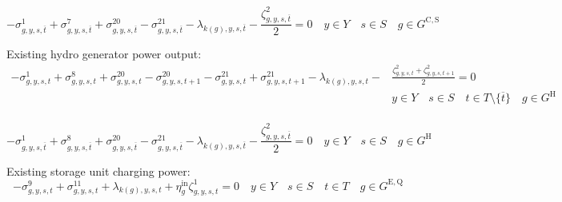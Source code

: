 \documentclass{article}
\newcommand{\sGeneratorsCandidateSolar}{G^{\mathrm{C,S}}}
\newcommand{\sGeneratorsHydro}{G^{\mathrm{H}}}
\newcommand{\sStorageExisting}{G^{\mathrm{E,Q}}}
\newcommand{\sYears}{Y}
\newcommand{\sScenarios}{S}
\newcommand{\sIntervals}{T}
\newcommand{\iGenerator}{g}
\newcommand{\iYear}{y}
\newcommand{\iScenario}{s}
\newcommand{\iInterval}{t}
\newcommand{\iIntervalTerminal}{\overline{\iInterval}}
\newcommand{\iZone}{z}
\newcommand{\cStorageUnitEfficiencyCharging}{\eta_{\iGenerator}^{\mathrm{in}}}
\newcommand{\dMinPowerOutput}[1][\iGenerator,\iYear,\iScenario,\iInterval]{\sigma_{#1}^{1}}
\newcommand{\dMaxPowerOutputSolarCandidate}[1][\iGenerator,\iYear,\iScenario,\iInterval]{\sigma_{#1}^{7}}
\newcommand{\dMaxPowerOutputHydro}[1][\iGenerator,\iYear,\iScenario,\iInterval]{\sigma_{#1}^{8}}
\newcommand{\dNonNegativeCharging}[1][\iGenerator,\iYear,\iScenario,\iInterval]{\sigma_{#1}^{9}}
\newcommand{\dMaxChargingRateExisting}[1][\iGenerator,\iYear,\iScenario,\iInterval]{\sigma_{#1}^{11}}
\newcommand{\dRampRateUp}[1][\iGenerator,\iYear,\iScenario,\iInterval]{\sigma_{#1}^{20}}
\newcommand{\dRampRateDown}[1][\iGenerator,\iYear,\iScenario,\iInterval]{\sigma_{#1}^{21}}
\newcommand{\dPowerBalance}[1][\iZone,\iYear,\iScenario,\iInterval]{\lambda_{#1}}
\newcommand{\dStorageEnergyTransition}[1][\iGenerator,\iYear,\iScenario,\iInterval]{\zeta_{#1}^{1}}
\newcommand{\dGeneratorEnergyOutput}[1][\iGenerator,\iYear,\iScenario,\iInterval]{\zeta_{#1}^{2}}
\begin{document}
\begin{equation}
-\dMinPowerOutput[\iGenerator,\iYear,\iScenario,\iIntervalTerminal] + \dMaxPowerOutputSolarCandidate[\iGenerator,\iYear,\iScenario,\iIntervalTerminal] + \dRampRateUp[\iGenerator,\iYear,\iScenario,\iIntervalTerminal] - \dRampRateDown[\iGenerator,\iYear,\iScenario,\iIntervalTerminal] - \dPowerBalance[k(\iGenerator),\iYear,\iScenario,\iIntervalTerminal] - \frac{\dGeneratorEnergyOutput[\iGenerator,\iYear,\iScenario,\iIntervalTerminal]}{2} = 0 \quad \iYear \in \sYears \quad \iScenario \in \sScenarios \quad \iGenerator \in \sGeneratorsCandidateSolar
\end{equation}

Existing hydro generator power output:
\begin{align}
-\dMinPowerOutput + \dMaxPowerOutputHydro + \dRampRateUp - \dRampRateUp[\iGenerator,\iYear,\iScenario,\iInterval+1] - \dRampRateDown + \dRampRateDown[\iGenerator,\iYear,\iScenario,\iInterval+1] - \dPowerBalance[k(\iGenerator),\iYear,\iScenario,\iInterval] - & \frac{\dGeneratorEnergyOutput + \dGeneratorEnergyOutput[\iGenerator,\iYear,\iScenario,\iInterval+1]}{2} = 0 \\\nonumber
& \iYear \in \sYears \quad \iScenario \in \sScenarios \quad \iInterval \in \sIntervals \setminus \{\iIntervalTerminal\} \quad \iGenerator \in \sGeneratorsHydro\\\nonumber
\end{align}

\begin{equation}
-\dMinPowerOutput[\iGenerator,\iYear,\iScenario,\iIntervalTerminal] + \dMaxPowerOutputHydro[\iGenerator,\iYear,\iScenario,\iIntervalTerminal] + \dRampRateUp[\iGenerator,\iYear,\iScenario,\iIntervalTerminal] - \dRampRateDown[\iGenerator,\iYear,\iScenario,\iIntervalTerminal] - \dPowerBalance[k(\iGenerator),\iYear,\iScenario,\iIntervalTerminal] - \frac{\dGeneratorEnergyOutput[\iGenerator,\iYear,\iScenario,\iIntervalTerminal]}{2} = 0 \quad \iYear \in \sYears \quad \iScenario \in \sScenarios \quad \iGenerator \in \sGeneratorsHydro
\end{equation}

Existing storage unit charging power:
\begin{equation}
- \dNonNegativeCharging + \dMaxChargingRateExisting + \dPowerBalance[k(\iGenerator),\iYear,\iScenario,\iInterval] + \cStorageUnitEfficiencyCharging\dStorageEnergyTransition = 0 \quad \iYear \in \sYears \quad \iScenario \in \sScenarios \quad \iInterval \in \sIntervals \quad \iGenerator \in \sStorageExisting
\end{equation}
\end{document}
